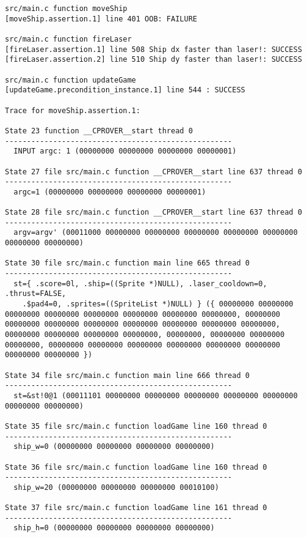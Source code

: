 \begin{verbatim}
src/main.c function moveShip
[moveShip.assertion.1] line 401 OOB: FAILURE

src/main.c function fireLaser
[fireLaser.assertion.1] line 508 Ship dx faster than laser!: SUCCESS
[fireLaser.assertion.2] line 510 Ship dy faster than laser!: SUCCESS

src/main.c function updateGame
[updateGame.precondition_instance.1] line 544 : SUCCESS

Trace for moveShip.assertion.1:

State 23 function __CPROVER__start thread 0
----------------------------------------------------
  INPUT argc: 1 (00000000 00000000 00000000 00000001)

State 27 file src/main.c function __CPROVER__start line 637 thread 0
----------------------------------------------------
  argc=1 (00000000 00000000 00000000 00000001)

State 28 file src/main.c function __CPROVER__start line 637 thread 0
----------------------------------------------------
  argv=argv' (00011000 00000000 00000000 00000000 00000000 00000000 00000000 00000000)

State 30 file src/main.c function main line 665 thread 0
----------------------------------------------------
  st={ .score=0l, .ship=((Sprite *)NULL), .laser_cooldown=0, .thrust=FALSE,
    .$pad4=0, .sprites=((SpriteList *)NULL) } ({ 00000000 00000000 00000000 00000000 00000000 00000000 00000000 00000000, 00000000 00000000 00000000 00000000 00000000 00000000 00000000 00000000, 00000000 00000000 00000000 00000000, 00000000, 00000000 00000000 00000000, 00000000 00000000 00000000 00000000 00000000 00000000 00000000 00000000 })

State 34 file src/main.c function main line 666 thread 0
----------------------------------------------------
  st=&st!0@1 (00011101 00000000 00000000 00000000 00000000 00000000 00000000 00000000)

State 35 file src/main.c function loadGame line 160 thread 0
----------------------------------------------------
  ship_w=0 (00000000 00000000 00000000 00000000)

State 36 file src/main.c function loadGame line 160 thread 0
----------------------------------------------------
  ship_w=20 (00000000 00000000 00000000 00010100)

State 37 file src/main.c function loadGame line 161 thread 0
----------------------------------------------------
  ship_h=0 (00000000 00000000 00000000 00000000)


\end{verbatim}
